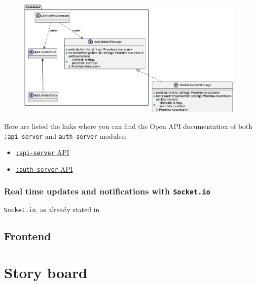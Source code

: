 \documentclass{scrartcl}
\begin{document}
\begin{figure}
    \centering
    \includegraphics[width=\linewidth]{figures/api-limiter-api.eps}
    \label{fig:api-limiter-api} 
\end{figure}

\begin{info}
    Here are listed the links where you can find the Open API documentation of both \texttt{:api-server} and \texttt{auth-server} modules:
    \begin{itemize}
        \item \href{https://tassiluca.github.io/ChainVote/swagger-ui-api/}{\texttt{:api-server} API}
        \item \href{https://tassiluca.github.io/ChainVote/swagger-ui-auth/}{\texttt{:auth-server} API}
    \end{itemize}
\end{info}

\fi

\subsubsection{Real time updates and notifications with \texttt{Socket.io}}

\texttt{Socket.io}, as already stated in 


\subsection{Frontend}



\section{Story board}
\end{document}
